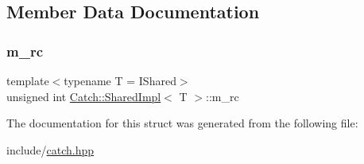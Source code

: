 \subsection{Member Data Documentation}
\mbox{\label{struct_catch_1_1_shared_impl_a7e71ef1985b85aa41a1632f932a96bcb}} 
\subsubsection{\texorpdfstring{m\+\_\+rc}{m\_rc}}
{\footnotesize\ttfamily template$<$typename T = I\+Shared$>$ \\
unsigned int \mbox{\hyperlink{struct_catch_1_1_shared_impl}{Catch\+::\+Shared\+Impl}}$<$ T $>$\+::m\+\_\+rc\hspace{0.3cm}{\ttfamily [mutable]}}



The documentation for this struct was generated from the following file\+:\begin{DoxyCompactItemize}
\item 
include/\mbox{\hyperlink{catch_8hpp}{catch.\+hpp}}\end{DoxyCompactItemize}
